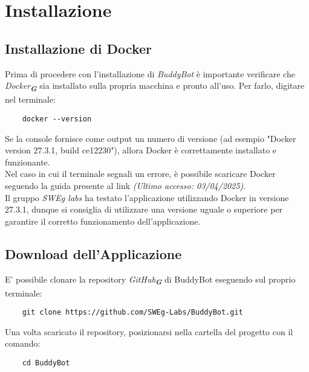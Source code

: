 

\section{Installazione}
\label{sec:installazione}

\subsection{Installazione di Docker}
Prima di procedere con l'installazione di \textit{BuddyBot} è importante verificare che \emph{Docker}\textsubscript{\textbf{\textit{G}}} sia installato sulla propria macchina e pronto all'uso.  
Per farlo, digitare nel terminale:
\begin{verbatim}
    docker --version
\end{verbatim}
Se la console fornisce come output un numero di versione (ad esempio "Docker version 27.3.1, build ce12230"), allora Docker è
correttamente
installato e funzionante.\\
Nel caso in cui il terminale segnali un errore, è possibile scaricare Docker seguendo la guida presente al link
\emph{(Ultimo accesso: 03/04/2025)}.\\
Il gruppo \emph{SWEg labs} ha testato l'applicazione utilizzando Docker in versione 27.3.1, dunque si consiglia di utilizzare una
versione uguale o superiore per garantire il corretto funzionamento dell'applicazione.

\subsection{Download dell'Applicazione}
E' possibile clonare la repository \emph{GitHub}\textsubscript{\textbf{\textit{G}}} di BuddyBot eseguendo sul proprio terminale:
\begin{verbatim}
    git clone https://github.com/SWEg-Labs/BuddyBot.git
\end{verbatim}
Una volta scaricato il repository, posizionarsi nella cartella del progetto con il comando:
\begin{verbatim}
    cd BuddyBot
\end{verbatim}

